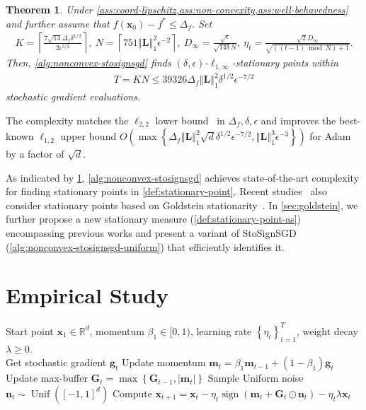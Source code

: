 \documentclass{article}
\newtheorem{thm}{Theorem}
\def \x {\mathbf{x}}
\def \g {\mathbf{g}}
\def \R {\mathbb{R}}
\def \Gb {\mathbf{G}}
\def \Lb {\mathbf{L}}
\def \m {\mathbf{m}}
\def \n {\mathbf{n}}
\DeclareMathOperator*{\sgn}{sign}
\DeclareMathOperator*{\unif}{Unif}
\newcommand{\norm}[1]{\left\Vert#1\right\Vert}
\newcommand{\abs}[1]{\left|#1\right|}
\newcommand{\sign}[1]{\sgn\left(#1\right)}
\newcommand{\brac}[1]{\left(#1\right)}
\newcommand{\cbrac}[1]{\left\{#1\right\}}
\def\ceil#1{\left\lceil #1 \right\rceil}
\begin{document}
\begin{thm}\label{thm:nonconvex-bound}
    Under \cref{ass:coord-lipschitz,ass:non-convexity,ass:well-behavedness} and further assume that $f(\x_0)-f^*\le\Delta_f$. Set
    \begin{align*}
    K=\ceil{\frac{7\sqrt{14}\Delta_f\delta^{1/2}}{2\epsilon^{3/2}}},\ N=\ceil{751\norm{\Lb}_1^2\epsilon^{-2}},\  D_\infty=\frac{\sqrt{\epsilon}}{\sqrt{14\delta}N},\ \eta_t=\frac{\sqrt{2}D_\infty}{\sqrt{((t-1)\bmod N)+1}}.
\end{align*}
Then, \cref{alg:nonconvex-stosignsgd} finds $(\delta,\epsilon)$-$\ell_{1,\infty}$-stationary points within
\begin{align*}
    T=KN\le39326\Delta_f\norm{\Lb}_1^2\delta^{1/2}\epsilon^{-7/2}
\end{align*}
stochastic gradient evaluations.
\end{thm}
The complexity matches the $\ell_{2,2}$ lower bound~\citep[Corollary~5.1]{zhang2024random} in $\Delta_f,\delta,\epsilon$ and improves the best-known $\ell_{1,2}$ upper bound $O\brac{\max\cbrac{\Delta_f\norm{\Lb}_1^2\sqrt{d}\delta^{1/2}\epsilon^{-7/2},\norm{\Lb}_1^3\epsilon^{-3}}}$ for Adam~\citep{ahn2024adamema} by a factor of $\sqrt{d}$.

As indicated by \cref{thm:nonconvex-bound}, \cref{alg:nonconvex-stosignsgd} achieves state-of-the-art complexity for finding stationary points in \cref{def:stationary-point}. Recent studies~\citep{cutkosky2023optimal} also consider stationary points based on Goldstein stationarity~\citep{goldstein1977optimization}. In \cref{sec:goldstein}, we further propose a new stationary measure (\cref{def:stationary-point-as}) encompassing previous works and present a variant of StoSignSGD (\cref{alg:nonconvex-stosignsgd-uniform}) that efficiently identifies it.

\section{Empirical Study\label{sec:experiments}}


\begin{algorithm}[t]
    \caption{Practical Implementation of StoSignSGD}
    \label{alg:practical-stosignsgd}
    \begin{algorithmic}[1]
     Start point $\x_1\in\R^d$, momentum $\beta_1\in[0,1)$, learning rate $\cbrac{\eta_t}_{t=1}^T$, weight decay $\lambda\ge0$.\\
    \STATE Get stochastic gradient $\g_t$
    \STATE Update momentum $\m_t=\beta_1\m_{t-1}+(1-\beta_1)\g_t$\hfill\COMMENT{\textcolor{gray}{$\m_1=\g_1$}}
    \STATE Update max-buffer $\Gb_t=\max\cbrac{\Gb_{t-1},\abs{\m_t}}$\hfill\COMMENT{\textcolor{gray}{$\Gb_1=\abs{\m_1}$}}
    \STATE Sample Uniform noise $\n_t\sim\unif\brac{[-1,1]^d}$
    \STATE Compute $\x_{t+1} = \x_t - \eta_t \sign{\m_t+\Gb_t\odot\n_t}-\eta_t\lambda\x_t$
    \ENDFOR
\end{algorithmic}
\end{algorithm}
\end{document}
